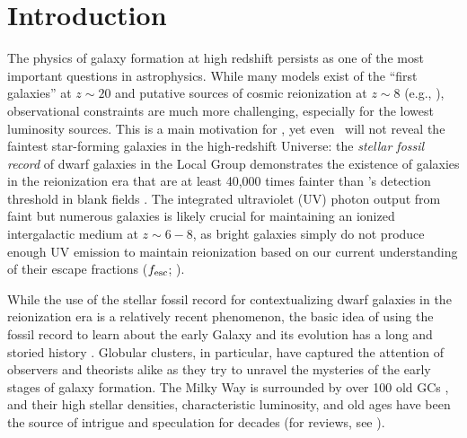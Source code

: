 \documentclass[fleqn,usenatbib]{mnras}
\begin{document}
\section{Introduction} 
\label{sec:intro}
The physics of galaxy formation at high redshift persists as one of the most
important questions in astrophysics. While many models exist of the ``first
galaxies'' at $z\sim20$ and putative sources of cosmic reionization at $z\sim8$
(e.g., \citealt{bromm2011, madau2017}), observational constraints are much more
challenging, especially for the lowest luminosity sources. This is a main
motivation for \jwst, yet even \jwst\ will not reveal the faintest star-forming
galaxies in the high-redshift Universe: the \textit{stellar fossil record} of
dwarf galaxies in the Local Group demonstrates the existence of galaxies in the
reionization era that are at least 40,000 times fainter than \jwst's detection
threshold in blank fields \citep{boylan-kolchin2015, weisz2017}. The integrated
ultraviolet (UV) photon output from faint but numerous galaxies is likely
crucial for maintaining an ionized intergalactic medium at $z \sim 6-8$, as
bright galaxies simply do not produce enough UV emission to maintain
reionization based on our current understanding of their escape fractions
($f_{\rm esc}$; \citealt{kuhlen2012a, robertson2013, bouwens2016, finkelstein2016,
  stark2016}).

While the use of the stellar fossil record for contextualizing dwarf galaxies in
the reionization era is a relatively recent phenomenon, the basic idea of using
the fossil record to learn about the early Galaxy and its evolution has a long
and storied history \citep{eggen1962, peebles1968, searle1978, larson1990,
  bland-hawthorn2000}. Globular clusters, in particular, have captured the
attention of observers and theorists alike as they try to unravel the mysteries
of the early stages of galaxy formation. The Milky Way is surrounded by over 100
old GCs \citep{harris1996}, and their high stellar densities, characteristic
luminosity, and old ages have been the source of intrigue and speculation for
decades (for reviews, see \citealt{harris1991, vandenberg1996, brodie2006,
  charbonnel2016a}).
\end{document}
